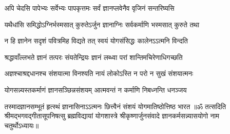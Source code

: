 \twolineshloka
{अपि चेदसि पापेभ्यः सर्वेभ्यः पापकृत्तमः}
{सर्वं ज्ञानप्लवेनैव वृजिनं सन्तरिष्यसि}%

\twolineshloka
{यथैधांसि समिद्धोऽग्निर्भस्मसात् कुरुतेऽर्जुन}
{ज्ञानाग्निः सर्वकर्माणि भस्मसात् कुरुते तथा}%

\twolineshloka
{न हि ज्ञानेन सदृशं पवित्रमिह विद्यते}
{तत् स्वयं योगसंसिद्धः कालेनऽऽत्मनि विन्दति}%

\twolineshloka
{श्रद्धावाँल्लभते ज्ञानं तत्परः संयतेन्द्रियः}
{ज्ञानं लब्ध्वा परां शान्तिमचिरेणाधिगच्छति}%

\twolineshloka
{अज्ञश्चाश्रद्दधानश्च संशयात्मा विनश्यति}
{नायं लोकोऽस्ति न परो न सुखं संशयात्मनः}%

\twolineshloka
{योगसन्न्यस्तकर्माणं ज्ञानसञ्छिन्नसंशयम्}
{आत्मवन्तं न कर्माणि निबध्नन्ति धनञ्जय}%

\twolineshloka
{तस्मादज्ञानसम्भूतं हृत्स्थं ज्ञानासिनाऽऽत्मनः}
{छित्त्वैनं संशयं योगमातिष्ठोत्तिष्ठ भारत}%
{॥ॐ तत्सदिति श्रीमद्भगवद्गीतासूपनिषत्सु ब्रह्मविद्यायां योगशास्त्रे श्रीकृष्णार्जुनसंवादे ज्ञानकर्मसन्न्यासयोगो नाम चतुर्थोऽध्यायः॥}

